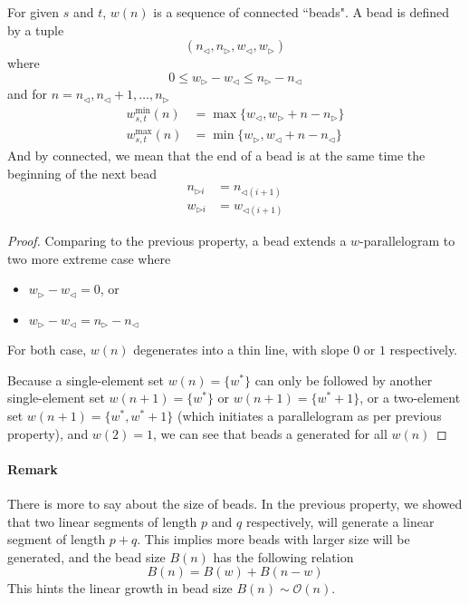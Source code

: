 \documentclass[]{article}
\begin{document}
\vspace{1cm}
\begin{lemma}[Beads]
	For given $s$ and $t$, $w(n)$ is a sequence of connected ``beads". A bead is defined by a tuple 
\[
	(n_{\triangleleft}, n_{\triangleright}, w_{\triangleleft}, w_{\triangleright})
\]
	where
\[
	0 \le w_{\triangleright} - w_{\triangleleft} \le  n_{\triangleright} - n_{\triangleleft}
\]
 and for $n = n_{\triangleleft}, n_{\triangleleft}+1,\dots,n_{\triangleright}$
\begin{align*}
w^{\min}_{s,t}(n) &= \max\{w_{\triangleleft}, w_{\triangleright} + n - n_{\triangleright}\}\\
w^{\max}_{s,t}(n) &= \min\{w_{\triangleright}, w_{\triangleleft} + n - n_{\triangleleft}\}
\end{align*}
And by connected, we mean that the end of a bead is at the same time the beginning of the next bead
\begin{align*}
n_{\triangleright i} &= n_{\triangleleft (i+1)}\\
w_{\triangleright i} &= w_{\triangleleft (i+1)}
\end{align*}

\end{lemma}
\begin{proof}
	Comparing to the previous property, a bead extends a $w$-parallelogram to two more extreme case where
	\begin{itemize}
		\item $w_{\triangleright} - w_{\triangleleft} = 0$, or
		\item $w_{\triangleright} - w_{\triangleleft} = n_{\triangleright} - n_{\triangleleft}$
	\end{itemize}
	For both case, $w(n)$ degenerates into a thin line, with slope $0$ or $1$ respectively. 
	
	Because a single-element set $w(n) = \{w^*\}$ can only be followed by another single-element set $w(n+1) = \{w^*\}$ or $w(n+1)=\{w^*+1\}$, or a two-element set $w(n+1) = \{w^*, w^*+1\}$ (which initiates a parallelogram as per previous property), and $w(2) = {1}$, we can see that beads a generated for all $w(n)$
\end{proof}

\paragraph{Remark}
There is more to say about the size of beads. In the previous property, we showed that two linear segments of length $p$ and $q$ respectively, will generate a linear segment of length $p + q$. This implies more beads with larger size will be generated, and the bead size $B(n)$ has the following relation
\[
	B(n) = B(w) + B(n-w)
\]
This hints the linear growth in bead size $B(n) \sim \mathcal{O}(n)$.
\end{document}
